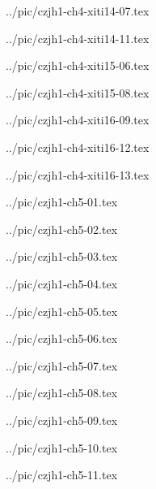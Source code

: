 

../pic/czjh1-ch4-xiti14-07.tex



../pic/czjh1-ch4-xiti14-11.tex



../pic/czjh1-ch4-xiti15-06.tex



../pic/czjh1-ch4-xiti15-08.tex



../pic/czjh1-ch4-xiti16-09.tex



../pic/czjh1-ch4-xiti16-12.tex



../pic/czjh1-ch4-xiti16-13.tex



../pic/czjh1-ch5-01.tex



../pic/czjh1-ch5-02.tex



../pic/czjh1-ch5-03.tex



../pic/czjh1-ch5-04.tex



../pic/czjh1-ch5-05.tex



../pic/czjh1-ch5-06.tex



../pic/czjh1-ch5-07.tex



../pic/czjh1-ch5-08.tex



../pic/czjh1-ch5-09.tex



../pic/czjh1-ch5-10.tex



../pic/czjh1-ch5-11.tex



